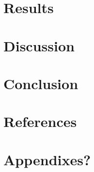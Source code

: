 \documentclass{article}
\begin{document}
\section{Results}

\section{Discussion}

\section{Conclusion}

\section*{References}

\section{Appendixes?}
\end{document}
